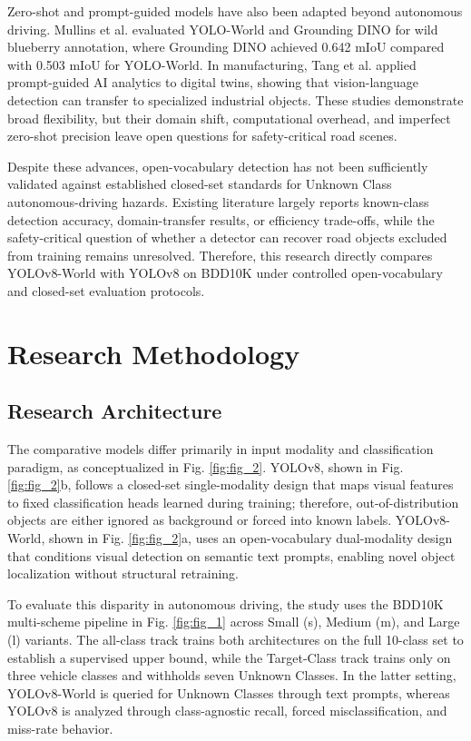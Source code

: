 \documentclass[conference]{IEEEtran}
\begin{document}
Zero-shot and prompt-guided models have also been adapted beyond autonomous driving. Mullins et al. \cite{agronomy14122830} evaluated YOLO-World and Grounding DINO for wild blueberry annotation, where Grounding DINO achieved 0.642 mIoU compared with 0.503 mIoU for YOLO-World. In manufacturing, Tang et al. \cite{Tang2025Prompt} applied prompt-guided AI analytics to digital twins, showing that vision-language detection can transfer to specialized industrial objects. These studies demonstrate broad flexibility, but their domain shift, computational overhead, and imperfect zero-shot precision leave open questions for safety-critical road scenes.

Despite these advances, open-vocabulary detection has not been sufficiently validated against established closed-set standards for Unknown Class autonomous-driving hazards. Existing literature largely reports known-class detection accuracy, domain-transfer results, or efficiency trade-offs, while the safety-critical question of whether a detector can recover road objects excluded from training remains unresolved. Therefore, this research directly compares YOLOv8-World with YOLOv8 on BDD10K under controlled open-vocabulary and closed-set evaluation protocols.


\section{Research Methodology}
\subsection{Research Architecture}


The comparative models differ primarily in input modality and classification paradigm, as conceptualized in Fig. \ref{fig:fig_2}. YOLOv8, shown in Fig. \ref{fig:fig_2}b, follows a closed-set single-modality design that maps visual features to fixed classification heads learned during training; therefore, out-of-distribution objects are either ignored as background or forced into known labels. YOLOv8-World, shown in Fig. \ref{fig:fig_2}a, uses an open-vocabulary dual-modality design that conditions visual detection on semantic text prompts, enabling novel object localization without structural retraining.

To evaluate this disparity in autonomous driving, the study uses the BDD10K multi-scheme pipeline in Fig. \ref{fig:fig_1} across Small (s), Medium (m), and Large (l) variants. The all-class track trains both architectures on the full 10-class set to establish a supervised upper bound, while the Target-Class track trains only on three vehicle classes and withholds seven Unknown Classes. In the latter setting, YOLOv8-World is queried for Unknown Classes through text prompts, whereas YOLOv8 is analyzed through class-agnostic recall, forced misclassification, and miss-rate behavior.
\end{document}
